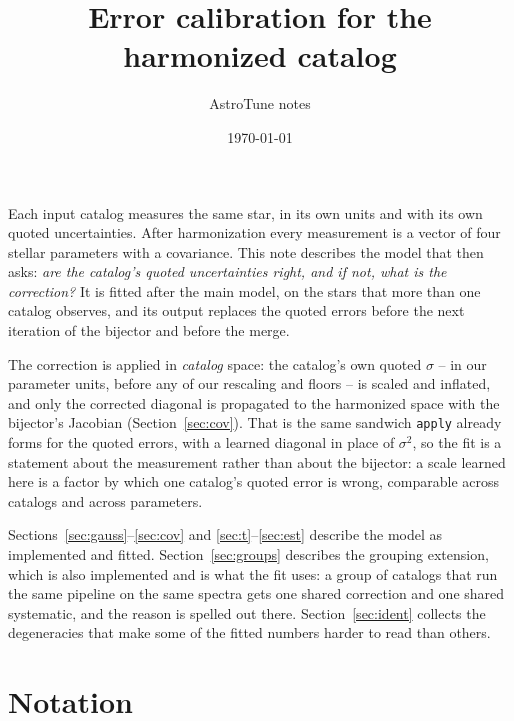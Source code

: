\documentclass[11pt,a4paper]{article}
\title{\bfseries Error calibration for the harmonized catalog}
\author{AstroTune notes}
\date{\today}
\begin{document}
\maketitle

\noindent
Each input catalog measures the same star, in its own units and with its own
quoted uncertainties. After harmonization every measurement is a vector of four
stellar parameters with a covariance. This note describes the model that then
asks: \emph{are the catalog's quoted uncertainties right, and if not, what is the
correction?} It is fitted after the main model, on the stars that more than one
catalog observes, and its output replaces the quoted errors before the next
iteration of the bijector and before the merge.

\noindent
The correction is applied in \emph{catalog} space: the catalog's own quoted
$\sigma$ -- in our parameter units, before any of our rescaling and floors -- is
scaled and inflated, and only the corrected diagonal is propagated to the
harmonized space with the bijector's Jacobian (Section~\ref{sec:cov}). That is
the same sandwich \texttt{apply} already forms for the quoted errors, with a
learned diagonal in place of $\sigma^2$, so the fit is a statement about the
measurement rather than about the bijector: a scale learned here is a factor by
which one catalog's quoted error is wrong, comparable across catalogs and across
parameters.

\noindent
Sections~\ref{sec:gauss}--\ref{sec:cov} and \ref{sec:t}--\ref{sec:est} describe
the model as implemented and fitted. Section~\ref{sec:groups} describes the
grouping extension, which is also implemented and is what the fit uses: a group
of catalogs that run the same pipeline on the same spectra gets one shared
correction and one shared systematic, and the reason is spelled out there.
Section~\ref{sec:ident} collects the degeneracies that make some of the fitted
numbers harder to read than others.

\section{Notation}
\end{document}
